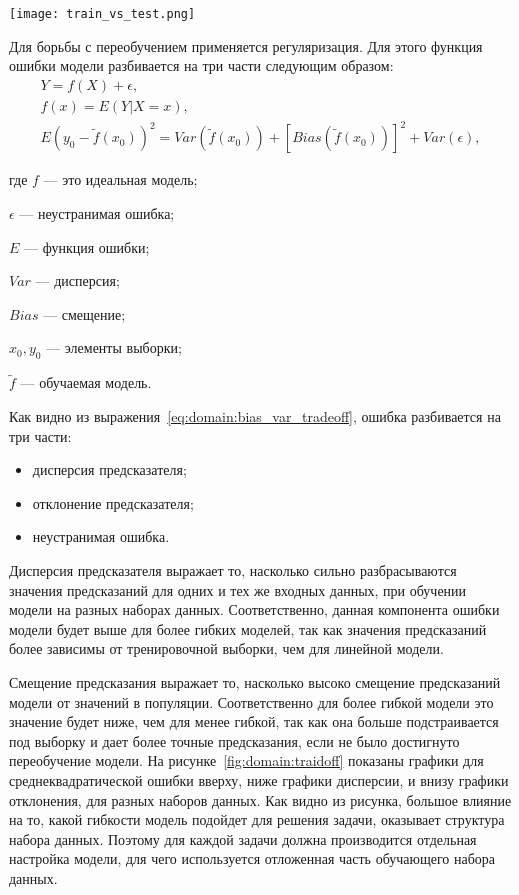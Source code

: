 \begin{center}
  \texttt{[image: train\_vs\_test.png]}
  \label{fig:domain:train_vs_test}
\end{center}

Для борьбы с переобучением применяется регуляризация. Для этого функция ошибки модели разбивается на три части следующим образом:
\begin{gather}
  Y = f(X) + \epsilon,\\
  f(x) = E(Y|X=x),\\
  \label{eq:domain:bias_var_tradeoff}
  E{(y_0-\tilde{f}(x_0))}^2 = Var(\tilde{f}(x_0)) + {[Bias(\tilde{f}(x_0))]}^2 + Var(\epsilon),
\end{gather}
\begin{explanationx}
\item[где] $f$ --- это идеальная модель;
\item $\epsilon$ --- неустранимая ошибка;
\item $E$ --- функция ошибки;
\item $Var$ --- дисперсия;
\item $Bias$ --- смещение;
\item $x_0, y_0$ --- элементы выборки;
\item $\tilde{f}$ --- обучаемая модель.
\end{explanationx}

Как видно из выражения~\ref{eq:domain:bias_var_tradeoff}, ошибка разбивается на три части:
\begin{itemize}
\item дисперсия предсказателя;
\item отклонение предсказателя;
\item неустранимая ошибка.
\end{itemize}

Дисперсия предсказателя выражает то, насколько сильно разбрасываются значения предсказаний для одних и тех же входных данных, при обучении модели на разных наборах данных. Соответственно, данная компонента ошибки модели будет выше для более гибких моделей, так как значения предсказаний более зависимы от тренировочной выборки, чем для линейной модели.

Смещение предсказания выражает то, насколько высоко смещение предсказаний модели от значений в популяции. Соответственно для более гибкой модели это значение будет ниже, чем для менее гибкой, так как она больше подстраивается под выборку и дает более точные предсказания, если не было достигнуто переобучение модели. На рисунке~\ref{fig:domain:traidoff} показаны графики для среднеквадратической ошибки вверху, ниже графики дисперсии, и внизу графики отклонения, для разных наборов данных. Как видно из рисунка, большое влияние на то, какой гибкости модель подойдет для решения задачи, оказывает структура набора данных. Поэтому для каждой задачи должна производится отдельная настройка модели, для чего используется отложенная часть обучающего набора данных.


